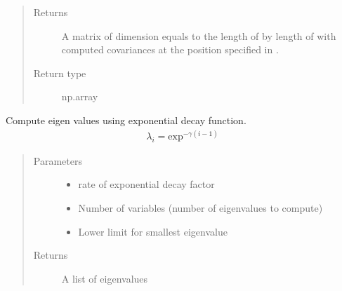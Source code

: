 \documentclass[letterpaper,10pt,english]{sphinxmanual}
\begin{document}
\begin{fulllineitems}
\begin{quote}
\begin{description}
\begin{itemize}
\end{itemize}

\item[{Returns}] \leavevmode
A matrix of dimension equals to the length of  by length of  with     computed covariances at the position specified in .

\item[{Return type}] \leavevmode
np.array

\end{description}\end{quote}

\end{fulllineitems}


\begin{fulllineitems}
\label{\detokenize{Utilities:pysimrel.utilities.get_eigen}}
Compute eigen values using exponential decay function.
\begin{equation*}
\begin{split}\lambda_i = \text{exp}^{-\gamma(i-1)}\end{split}
\end{equation*}\begin{quote}\begin{description}
\item[{Parameters}] \leavevmode\begin{itemize}
\item {} 
 \textendash{} rate of exponential decay factor

\item {} 
 \textendash{} Number of variables (number of eigenvalues to compute)

\item {} 
 \textendash{} Lower limit for smallest eigenvalue

\end{itemize}

\item[{Returns}] \leavevmode
A list of eigenvalues

\end{description}\end{quote}

\end{fulllineitems}
\end{document}
